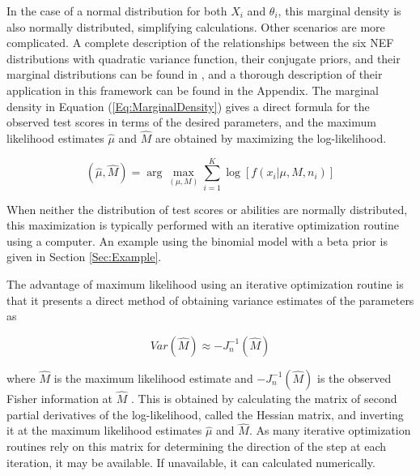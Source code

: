 \documentclass[12pt,epsfig]{article}
\begin{document}
\noindent In the case of a normal distribution for both $X_i$ and $\theta_i$, this marginal density is also normally distributed, simplifying calculations. Other scenarios are more complicated. A complete description of the relationships between the six NEF distributions with quadratic variance function, their conjugate priors, and their marginal distributions can be found in \cite{Morris2009}, and a thorough description of their application in this framework can be found in the Appendix. The marginal density in Equation (\ref{Eq:MarginalDensity}) gives a direct formula for the observed test scores in terms of the desired parameters, and the maximum likelihood estimates $\hat{\mu}$ and $\hat{M}$ are obtained by maximizing the log-likelihood.

\begin{equation*}
(\hat{\mu}, \hat{M}) = \displaystyle \arg \max_{(\mu, M)} \sum_{i = 1}^K \log[f(x_i | \mu, M, n_i)]
\end{equation*}

\noindent When neither the distribution of test scores or abilities are normally distributed, this maximization is typically performed with an iterative optimization routine using a computer. An example using the binomial model with a beta prior is given in Section \ref{Sec:Example}. 

The advantage of maximum likelihood using an iterative optimization routine is that it presents a direct method of obtaining variance estimates of the parameters as

\begin{equation}
    Var(\hat{M}) \approx -J_n^{-1}(\hat{M})
    \label{Eq:MVariance}
\end{equation}

\noindent where $\hat{M}$ is the maximum likelihood estimate and $-J_n^{-1}(\hat{M})$ is the observed Fisher information at $\hat{M}$ \citep{CasellaBerger}. This is obtained by calculating the matrix of second partial derivatives of the log-likelihood, called the Hessian matrix, and inverting it at the maximum likelihood estimates $\hat{\mu}$ and $\hat{M}$. As many iterative optimization routines rely on this matrix for determining the direction of the step at each iteration, it may be available. If unavailable, it can calculated numerically.

\end{document}
